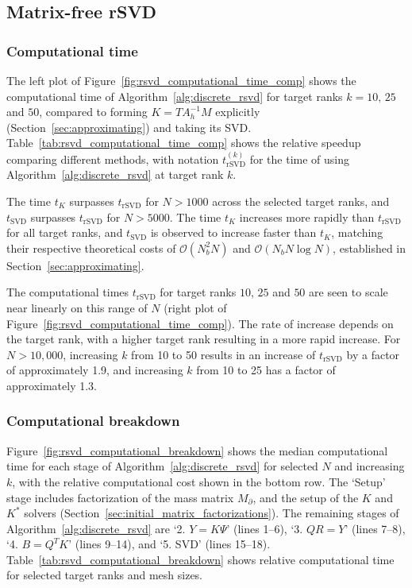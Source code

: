 \subsection{Matrix-free rSVD}
\subsubsection{Computational time}\label{sec:computational_time}


The left plot of Figure~\ref{fig:rsvd_computational_time_comp} shows the computational time of Algorithm~\ref{alg:discrete_rsvd} for target ranks $k = 10,\, 25$ and $50$, compared to forming $K = T A_h^{-1} M$ explicitly (Section~\ref{sec:approximating}) and taking its SVD. Table~\ref{tab:rsvd_computational_time_comp} shows the relative speedup comparing different methods, with notation $t^{(k)}_{\text{rSVD}}$ for the time of using Algorithm~\ref{alg:discrete_rsvd} at target rank $k$.

The time $t_K$ surpasses $t_{\text{rSVD}}$ for $N > 1000$ across the selected target ranks, and $t_{\text{SVD}}$ surpasses $t_{\text{rSVD}}$ for $N > 5000$. The time $t_{K}$ increases more rapidly than $t_{\text{rSVD}}$ for all target ranks, and $t_{\text{SVD}}$ is observed to increase faster than $t_{K}$, matching their respective theoretical costs of $\mathcal{O}(N_b^2 N)$ and $\mathcal{O}(N_b N \log N)$, established in Section~\ref{sec:approximating}.
 
The computational times $t_{\text{rSVD}}$ for target ranks $10$, $25$ and $50$ are seen to scale near linearly on this range of $N$ (right plot of Figure~\ref{fig:rsvd_computational_time_comp}). The rate of increase depends on the target rank, with a higher target rank resulting in a more rapid increase. For $N>10{,}000$, increasing $k$ from 10 to 50 results in an increase of $t_{\text{rSVD}}$ by a factor of approximately 1.9, and increasing $k$ from 10 to 25 has a factor of approximately 1.3. 


\subsubsection{Computational breakdown}\label{sec:computational_breakdown}


Figure~\ref{fig:rsvd_computational_breakdown} shows the median computational time for each stage of Algorithm~\ref{alg:discrete_rsvd} for selected $N$ and increasing $k$, with the relative computational cost shown in the bottom row. The `Setup' stage includes factorization of the mass matrix $M_\partial$, and the setup of the $K$ and $K^*$ solvers (Section~\ref{sec:initial_matrix_factorizations}). The remaining stages of Algorithm~\ref{alg:discrete_rsvd} are `2. $Y = K\Psi$' (lines 1--6), `3. $QR = Y$' (lines 7--8), `4. $B = Q^T K$' (lines 9--14), and `5. SVD' (lines 15--18). Table~\ref{tab:rsvd_computational_breakdown} shows relative computational time for selected target ranks and mesh sizes.

